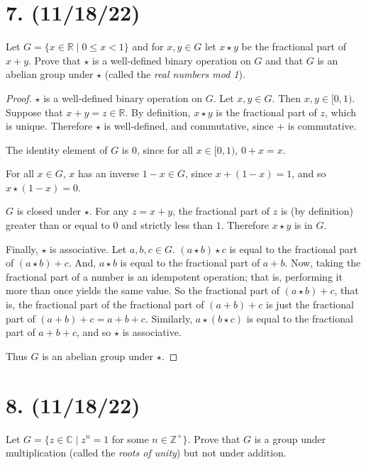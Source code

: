 \documentclass{article}
\begin{document}
\section*{7. (11/18/22)}

Let $G = \{x \in \mathbb{R} \mid 0 \leq x < 1\}$ and for $x, y \in G$ let $x \star y$ be the fractional part of $x + y$. Prove that $\star$ is a well-defined binary operation on $G$ and that $G$ is an abelian group under $\star$ (called the \emph{real numbers mod 1}).

\begin{proof}
      $\star$ is a well-defined binary operation on $G$. Let $x, y \in G$. Then $x, y \in [0, 1)$. Suppose that $x + y = z \in \mathbb{R}$. By definition, $x \star y$ is the fractional part of $z$, which is unique. Therefore $\star$ is well-defined, and commutative, since $+$ is commutative.

      The identity element of $G$ is $0$, since for all $x \in [0, 1)$, $0 + x = x$.

      For all $x \in G$, $x$ has an inverse $1-x \in G$, since $x + (1-x) = 1$, and so $x \star (1-x) = 0$.

      $G$ is closed under $\star$. For any $z = x + y$, the fractional part of $z$ is (by definition) greater than or equal to $0$ and strictly less than $1$. Therefore $x \star y$ is in $G$.

      Finally, $\star$ is associative. Let $a, b, c \in G$. $(a \star b) \star c$ is equal to the fractional part of $(a \star b) + c$. And, $a \star b$ is equal to the fractional part of $a + b$. Now, taking the fractional part of a number is an idempotent operation; that is, performing it more than once yields the same value. So the fractional part of $(a \star b) + c$, that is, the fractional part of the fractional part of $(a + b) + c$ is just the fractional part of $(a + b) + c = a + b + c$. Similarly, $a \star (b \star c)$ is equal to the fractional part of $a + b + c$, and so $\star$ is associative.

      Thus $G$ is an abelian group under $\star$.
\end{proof}

\section*{8. (11/18/22)}

Let $G = \{z \in \mathbb{C} \mid z^n = 1$ for some $n \in \mathbb{Z}^+\}$. Prove that $G$ is a group under multiplication (called the \emph{roots of unity}) but not under addition.
\end{document}
